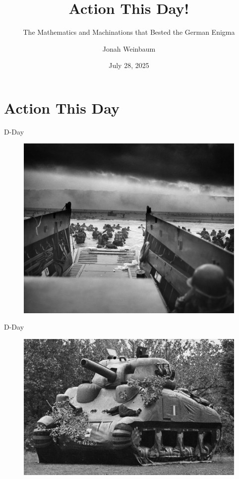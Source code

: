 \documentclass[hyphens,aspectratio=169]{beamer}
\title{Action This Day!}
\subtitle{The Mathematics and Machinations that Bested the German Enigma}
\author{Jonah Weinbaum}
\date{
July 28, 2025
}
\begin{document}
\frame{\titlepage}

\section{Action This Day}

\begin{frame}[fragile]{D-Day}
\begin{center}
    \begin{figure}
        \includegraphics[scale=0.11]{paper/images/dday.jpg}
    \end{figure}
    \small
    \caption{\emph{Into the Jaws of Death} -- Robert F. Sargent -- June 6, 1944 (D-Day)}
\end{center}
\end{frame}

\begin{frame}[fragile]{D-Day}
\begin{center}
    \begin{figure}
        \includegraphics[scale=0.3]{paper/images/dummy_tank.jpg}
    \end{figure}
    \small
    \caption{Inflatable M4 Sherman Tank -- Operation Bodyguard}
\end{center}
\end{frame}
\end{document}
